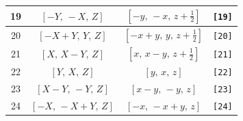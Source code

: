 \documentclass[fleqn,8pt]{jsarticle}
\begin{document}
\begin{longtable}{cccc}
19 & $\left[ - Y,\, - X,\, Z \right]$ & $\left[ - y,\, - x,\, z + \frac{1}{2} \right]$ & {\tt [19]} \\ \hline
20 & $\left[ - X + Y,\, Y,\, Z \right]$ & $\left[ - x + y,\, y,\, z + \frac{1}{2} \right]$ & {\tt [20]} \\ \hline
21 & $\left[ X,\, X - Y,\, Z \right]$ & $\left[ x,\, x - y,\, z + \frac{1}{2} \right]$ & {\tt [21]} \\ \hline
22 & $\left[ Y,\, X,\, Z \right]$ & $\left[ y,\, x,\, z \right]$ & {\tt [22]} \\ \hline
23 & $\left[ X - Y,\, - Y,\, Z \right]$ & $\left[ x - y,\, - y,\, z \right]$ & {\tt [23]} \\ \hline
24 & $\left[ - X,\, - X + Y,\, Z \right]$ & $\left[ - x,\, - x + y,\, z \right]$ & {\tt [24]} \\
\end{longtable}
\end{document}
